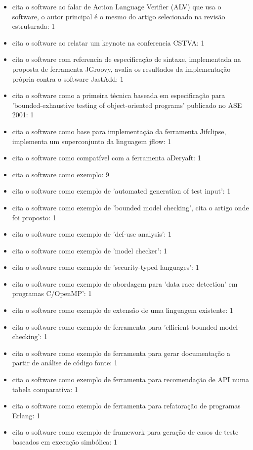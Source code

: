 \begin{itemize}
\item cita o software ao falar de Action Language Verifier (ALV) que usa o software, o autor principal é o mesmo do artigo selecionado na revisão estruturada: 1
\item cita o software ao relatar um keynote na conferencia CSTVA: 1
\item cita o software com referencia de especificação de sintaxe, implementada na proposta de ferramenta JGroovy, avalia os resultados da implementação própria contra o software JastAdd: 1
\item cita o software como a primeira técnica baseada em especificação para 'bounded-exhaustive testing of object-oriented programs' publicado no ASE 2001: 1
\item cita o software como base para implementação da ferramenta Jifclipse, implementa um superconjunto da linguagem jflow: 1
\item cita o software como compatível com a ferramenta aDeryaft: 1
\item cita o software como exemplo: 9
\item cita o software como exemplo de 'automated generation of test input': 1
\item cita o software como exemplo de 'bounded model checking', cita o artigo onde foi proposto: 1
\item cita o software como exemplo de 'def-use analysis': 1
\item cita o software como exemplo de 'model checker': 1
\item cita o software como exemplo de 'security-typed languages': 1
\item cita o software como exemplo de abordagem para 'data race detection' em programas C/OpenMP': 1
\item cita o software como exemplo de extensão de uma linguagem existente: 1
\item cita o software como exemplo de ferramenta para 'efficient bounded model-checking': 1
\item cita o software como exemplo de ferramenta para gerar documentação a partir de análise de código fonte: 1
\item cita o software como exemplo de ferramenta para recomendação de API numa tabela comparativa: 1
\item cita o software como exemplo de ferramenta para refatoração de programas Erlang: 1
\item cita o software como exemplo de framework para geração de casos de teste baseados em execução simbólica: 1

\end{itemize}

